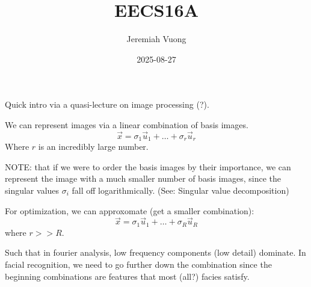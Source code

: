 \documentclass{article}
\title{EECS16A}
\author{Jeremiah Vuong}
\date{2025-08-27}
\begin{document}

\maketitle

\tableofcontents
\newpage

Quick intro via a quasi-lecture on image processing (?).

We can represent images via a linear combination of basis images.
$$
\vec{x} = \sigma_1 \vec{u}_1 + \ldots + \sigma_r \vec{u}_r
$$
Where $r$ is an incredibly large number.

NOTE: that if we were to order the basis images by their importance, we can represent the image with a much smaller number of basis images,
since the singular values $\sigma_i$ fall off logarithmically. (See: Singular value decomposition)

For optimization, we can approxomate (get a smaller combination):
$$ \vec{x} = \sigma_1 \vec{u}_1 + \ldots + \sigma_R \vec{u}_R $$
where $r >> R$.

Such that in fourier analysis, low frequency components (low detail) dominate.
In facial recognition, we need to go further down the combination since the beginning combinations
are features that most (all?) facies satisfy.
\end{document}
